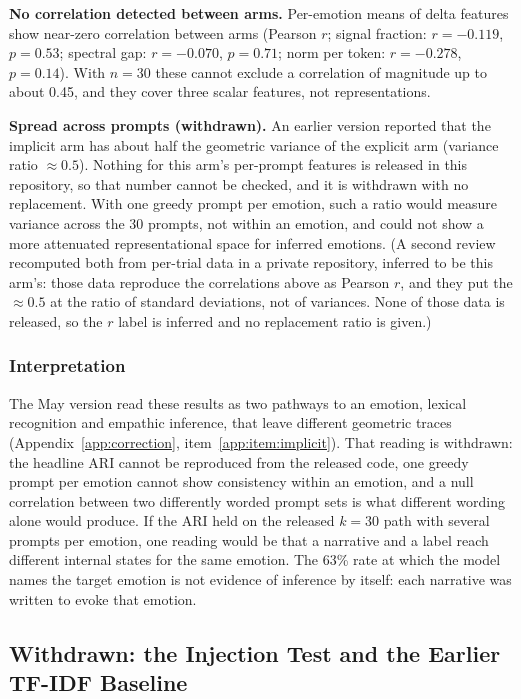 \documentclass[11pt,a4paper]{article}
\begin{document}
\textbf{No correlation detected between arms.}
Per-emotion means of delta features show near-zero correlation between
arms (Pearson $r$; signal fraction: $r = -0.119$, $p = 0.53$; spectral gap:
$r = -0.070$, $p = 0.71$; norm per token: $r = -0.278$,
$p = 0.14$). With $n = 30$ these cannot exclude a correlation of
magnitude up to about 0.45, and they cover three scalar features, not
representations.

\textbf{Spread across prompts (withdrawn).} An earlier version reported that the implicit arm has about half the geometric variance of the explicit arm (variance ratio $\approx 0.5$). Nothing for this arm's per-prompt features is released in this repository, so that number cannot be checked, and it is withdrawn with no replacement. With one greedy prompt per emotion, such a ratio would measure variance across the 30 prompts, not within an emotion, and could not show a more attenuated representational space for inferred emotions. (A second review recomputed both from per-trial data in a private repository, inferred to be this arm's: those data reproduce the correlations above as Pearson $r$, and they put the $\approx 0.5$ at the ratio of standard deviations, not of variances. None of those data is released, so the $r$ label is inferred and no replacement ratio is given.)

\subsubsection{Interpretation}

The May version read these results as two pathways to an emotion, lexical recognition and empathic inference, that leave different geometric traces (Appendix~\ref{app:correction}, item~\ref{app:item:implicit}). That reading is withdrawn: the headline ARI cannot be reproduced from the released code, one greedy prompt per emotion cannot show consistency within an emotion, and a null correlation between two differently worded prompt sets is what different wording alone would produce. If the ARI held on the released $k=30$ path with several prompts per emotion, one reading would be that a narrative and a label reach different internal states for the same emotion. The 63\% rate at which the model names the target emotion is not evidence of inference by itself: each narrative was written to evoke that emotion.

\subsection{Withdrawn: the Injection Test and the Earlier TF-IDF Baseline}
\label{sec:injection_results}
\label{sec:text_baseline_results}
\end{document}

